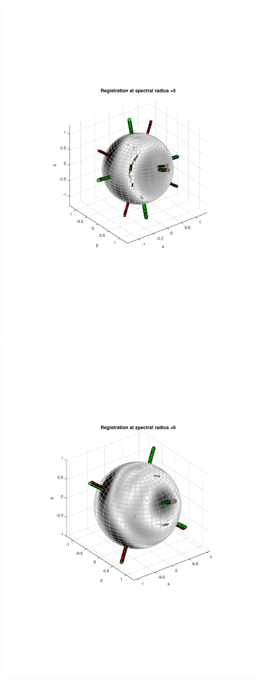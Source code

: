 \documentclass{UCF_ETD}
\begin{document}
\begin{figure}[H]
\begin{center}
\includegraphics[scale=0.38]{RobustRegistration/NoisyVolumeTransReg_5}
\includegraphics[scale=0.38]{RobustRegistration/NoisyVolumeTransReg_6}

\end{center}
\end{figure}
\end{document}
